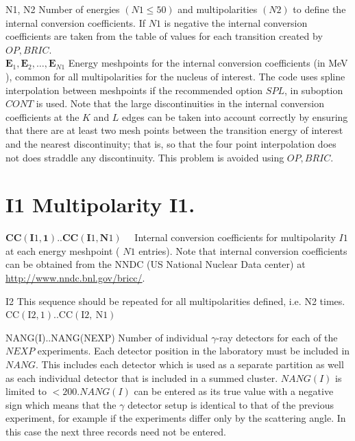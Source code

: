 \documentclass[10pt]{article}
\begin{document}
N1, N2 Number of energies $(N 1 \leq 50)$ and multipolarities $(N 2)$ to define the internal conversion coefficients. If $N 1$ is negative the internal conversion coefficients are taken from the table of values for each transition created by $O P, B R I C$.\\
$\mathbf{E}_{1}, \mathbf{E}_{2}, \ldots, \mathbf{E}_{N 1}$ Energy meshpoints for the internal conversion coefficients (in MeV ), common for all multipolarities for the nucleus of interest. The code uses spline interpolation between meshpoints if the recommended option $S P L$, in suboption $C O N T$ is used. Note that the large discontinuities in the internal conversion coefficients at the $K$ and $L$ edges can be taken into account correctly by ensuring that there are at least two mesh points between the transition energy of interest and the nearest discontinuity; that is, so that the four point interpolation does not does straddle any discontinuity. This problem is avoided using $O P, B R I C$.

\section*{I1 Multipolarity I1.}
$\mathbf{C C}(\mathbf{I} 1, \mathbf{1}) . . \mathbf{C C}(\mathbf{I} 1, \mathbf{N} 1) \quad$ Internal conversion coefficients for multipolarity $I 1$ at each energy meshpoint ( $N 1$ entries). Note that internal conversion coefficients can be obtained from the NNDC (US National Nuclear Data center) at \href{http://www.nndc.bnl.gov/bricc/}{http://www.nndc.bnl.gov/bricc/}.

I2 This sequence should be repeated for all multipolarities defined, i.e. N2 times.\\
$\mathrm{CC}(\mathrm{I} 2,1) . . \mathrm{CC}(\mathrm{I} 2, \mathrm{~N} 1)$

NANG(I)..NANG(NEXP) Number of individual $\gamma$-ray detectors for each of the $N E X P$ experiments. Each detector position in the laboratory must be included in $N A N G$. This includes each detector which is used as a separate partition as well as each individual detector that is included in a summed cluster. $N A N G(I)$ is limited to $<200 . N A N G(I)$ can be entered as its true value with a negative sign which means that the $\gamma$ detector setup is identical to that of the previous experiment, for example if the experiments differ only by the scattering angle. In this case the next three records need not be entered.
\end{document}

